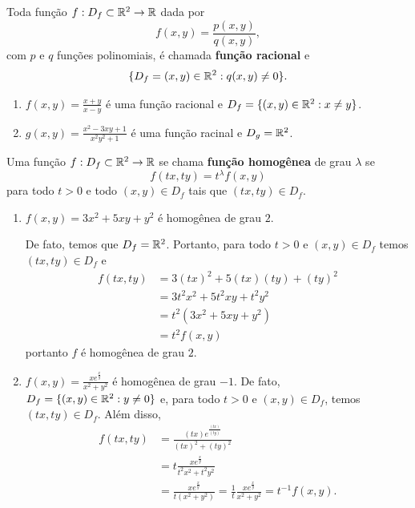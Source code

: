 \begin{definition}
    Toda função \(f:D_f \subset\mathbb{R}^2 \to \mathbb{R}\) dada por \[f(x,y) = \frac{p(x,y)}{q(x,y)},\] com \(p\) e \(q\) funções polinomiais, é chamada \textbf{função racional} e \[\{D_f = (x,y)\in\mathbb{R}^2 : q(x,y)\neq 0\}.\]
\end{definition}

\begin{example}
    \begin{enumerate}
        \item \(f(x,y) = \frac{x+y}{x-y}\) é uma função racional e \(D_f = \{(x,y)\in\mathbb{R}^2 : x\neq y\}\).
        \item \(g(x,y) = \frac{x^2 - 3xy + 1}{x^2 y^2 + 1}\) é uma função racinal e \(D_g = \mathbb{R}^2\).
    \end{enumerate}
\end{example}

\begin{definition}
    Uma função \(f:D_f \subset \mathbb{R}^2 \to \mathbb{R}\) se chama \textbf{função homogênea} de grau \(\lambda\) se \[f(tx,ty) = t^\lambda f(x,y)\] para todo \(t>0\) e todo \((x,y)\in D_f\) tais que \((tx,ty)\in D_f\).
\end{definition}

\begin{example}
    \begin{enumerate}
        \item \(f(x,y) = 3x^2 + 5xy + y^2\) é homogênea de grau \(2\).
        
        De fato, temos que \(D_f = \mathbb{R}^2\). Portanto, para todo \(t>0\) e \((x,y)\in D_f\) temos \((tx,ty)\in D_f\) e
            \begin{align*}
                f(tx,ty)
                    & = 3(tx)^2 + 5(tx)(ty) + (ty)^2 \\
                    & = 3t^2x^2 + 5t^2xy + t^2y^2 \\
                    & = t^2(3x^2+5xy+y^2) \\
                    & = t^2 f(x,y)
            \end{align*}
        portanto \(f\) é homogênea de grau \(2\).
        \item \(f(x,y) = \frac{xe^{\frac{x}{y}}}{x^2 + y^2}\) é homogênea de grau \(-1\). De fato, \(D_f = \{(x,y)\in\mathbb{R}^2 : y\neq 0\}\) e, para todo \(t>0\) e \((x,y)\in D_f\), temos \((tx,ty)\in D_f\). Além disso,
            \begin{align*}
                f(tx,ty)
                    & = \frac{(tx)e^{\frac{(tx)}{(ty)}}}{(tx)^2 + (ty)^2} \\
                    & = t \frac{xe^{\frac{x}{y}}}{t^2x^2 + t^2y^2} \\
                    & = \frac{xe^{\frac{x}{y}}}{t(x^2 + y^2)} = \frac{1}{t} \frac{xe^{\frac{x}{y}}}{x^2 + y^2} = t^{-1} f(x,y).
            \end{align*}
    \end{enumerate}
\end{example}

